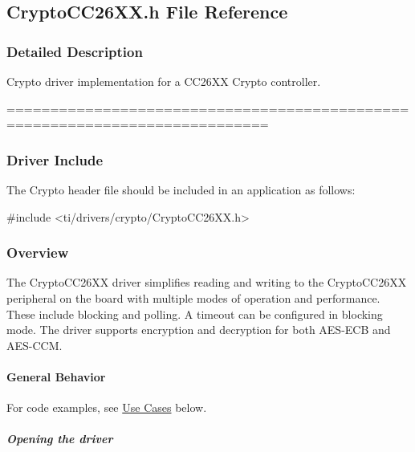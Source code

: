 \subsection{Crypto\+C\+C26\+X\+X.\+h File Reference}
\label{_crypto_c_c26_x_x_8h}


\subsubsection{Detailed Description}
Crypto driver implementation for a C\+C26\+X\+X Crypto controller. 

============================================================================

\subsubsection*{Driver Include}

The Crypto header file should be included in an application as follows\+: 
\begin{DoxyCode}
\textcolor{preprocessor}{#include <ti/drivers/crypto/CryptoCC26XX.h>}
\end{DoxyCode}


\subsubsection*{Overview}

The Crypto\+C\+C26\+X\+X driver simplifies reading and writing to the Crypto\+C\+C26\+X\+X peripheral on the board with multiple modes of operation and performance. These include blocking and polling. A timeout can be configured in blocking mode. The driver supports encryption and decryption for both A\+E\+S-\/\+E\+C\+B and A\+E\+S-\/\+C\+C\+M.

\paragraph*{General Behavior}

For code examples, see \hyperlink{_crypto_c_c26_x_x_8h_CRYPTO_USE_CASES}{Use Cases} below.

\subparagraph*{Opening the driver}


